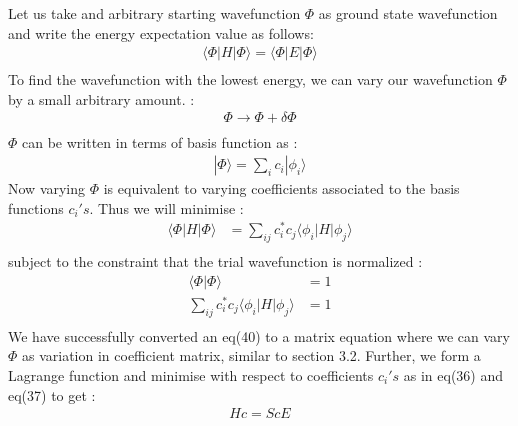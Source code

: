 \documentclass[11pt]{article}   	%
\begin{document}
	Let us take and arbitrary starting wavefunction $\Phi$ as ground state wavefunction and 
	write the energy expectation value as follows:\\
	\begin{equation}
	\begin{split}
		\langle\Phi|H|\Phi\rangle=\langle\Phi|E|\Phi\rangle\\
	\end{split}
	\end{equation}
	To find the wavefunction with the lowest energy, we can vary our 
	wavefunction $\Phi$ by a small arbitrary amount. :
	\begin{equation}
	\begin{split}
		\Phi\rightarrow\Phi+\delta\Phi\\
	\end{split}
	\end{equation}
	$\Phi$ can be written in terms of basis function as :
	\begin{equation}
	\begin{split}
		|\Phi\rangle=\sum_{i} c_{i}|\phi_{i}\rangle
	\end{split}
	\end{equation}
	Now varying $\Phi$ is equivalent to varying coefficients associated to the basis functions 
	$c_i's$. Thus we will minimise :\\
	\begin{equation}
	\begin{split}
		\langle\Phi|H|\Phi\rangle&=\sum_{ij}c_i^*c_j\langle\phi_i|H|\phi_j\rangle\\
	\end{split}
	\end{equation}
	subject to the constraint that the trial wavefunction is normalized :\\
	\begin{equation}
	\begin{split}
		\langle\Phi|\Phi\rangle&=1\\
		\sum_{ij}c_i^*c_j\langle\phi_i|H|\phi_j\rangle&=1\\
	\end{split}
	\end{equation}	
	We have successfully converted an eq(40) to a  matrix equation where we can vary $\Phi$ as variation 
	in coefficient matrix, similar to section 3.2. Further, we form a Lagrange function and 
	minimise with respect to coefficients $c_i's$ as in eq(36) and eq(37) to get :
	\begin{equation}
	\begin{split}
		Hc=ScE
	\end{split}
	\end{equation}
\end{document}
